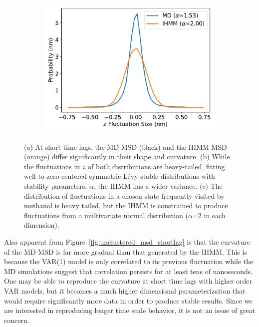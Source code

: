 \documentclass{article}
\begin{document}
\begin{figure}
\begin{subfigure}{0.32\textwidth}
  \includegraphics[width=\textwidth]{state_emission_widths.pdf}
  \caption{}\label{fig:state_emission_widths}
  \end{subfigure}
  \caption{(a) At short time lags, the MD MSD (black) and the IHMM MSD (orange)
  differ significantly in their shape and curvature. (b) While the 
  fluctuations in $z$ of both distributions are heavy-tailed, fitting well to zero-centered
  symmetric L\'evy stable distributions with stability parameters, $\alpha$, the IHMM has
  a wider variance. (c) The distribution of fluctuations in a chosen state frequently
  visited by methanol is heavy tailed, but the IHMM is constrained to produce fluctuations
  from a multivariate normal distribution ($\alpha$=2 in each dimension).
  }\label{fig:short_timelags}
  \end{figure}
  
  Also apparent from Figure~\ref{fig:unclustered_msd_shortlag} is that the 
  curvature of the MD MSD is far more gradual than that generated by the IHMM.
  This is because the VAR(1) model is only correlated to its previous fluctuation
  while the MD simulations suggest that correlation persists for at least tens
  of nanoseconds.
  One may be able to reproduce the curvature at short time lags with higher order
  VAR models, but it becomes a much higher dimensional parameterization that would
  require significantly more data in order to produce stable results. Since we 
  are interested in reproducing longer time scale behavior, it is not an issue of
  great concern.
  
\end{document}
